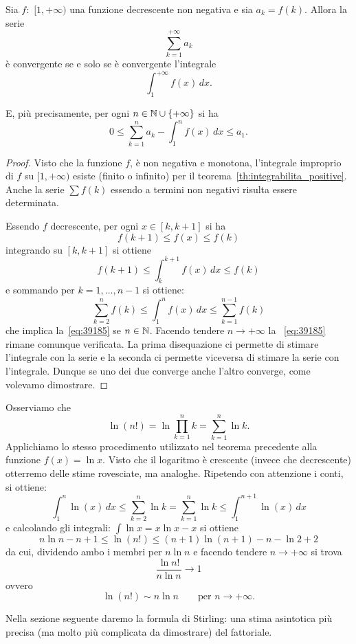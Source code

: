 \begin{theorem}
\mymark{**}
Sia $f\colon$ $[1,+\infty)$ una funzione decrescente non negativa
e sia $a_k=f(k)$.
Allora la serie
\[
   \sum_{k=1}^{+\infty} a_k
\]
è convergente se e solo se è convergente l'integrale
\[
  \int_1^{+\infty} f(x)\, dx.
\]

E, più precisamente, per ogni $n\in \mathbb N\cup{\left\{ +\infty \right\}}$ si ha
\begin{equation}\label{eq:39185}
  0
  \le \sum_{k=1}^{n} a_k - \int_1^{n}f(x)\, dx
  \le a_1.
\end{equation}

\end{theorem}
%
\begin{proof}
\mymark{**}
Visto che la funzione $f$, è non negativa e monotona,
l'integrale improprio di $f$ su $[1,+\infty)$ esiste (finito o infinito)
per il teorema~\ref{th:integrabilita_positive}.
Anche la serie $\sum f(k)$ essendo a termini non negativi risulta essere determinata.

Essendo $f$ decrescente, per ogni $x \in [k,k+1]$ si ha
\[
  f(k+1) \le f(x) \le f(k)
\]
integrando su $[k,k+1]$ si ottiene
\[
  f(k+1) \le \int_{k}^{k+1} f(x)\, dx \le f(k)
\]
e sommando per $k=1,\dots, n-1$ si ottiene:
\[
  \sum_{k=2}^{n} f(k) \le \int_{1}^{n} f(x)\, dx \le \sum_{k=1}^{n-1} f(k)
\]
che implica la~\eqref{eq:39185} se $n\in \mathbb N$. Facendo
tendere $n\to+\infty$ la ~\eqref{eq:39185} rimane comunque verificata.
La prima disequazione ci permette di stimare l'integrale con la serie
e la seconda ci permette viceversa di stimare la serie con l'integrale.
Dunque se uno dei due converge anche l'altro converge, come volevamo dimostrare.
\end{proof}

\begin{example}
\label{ex:498124}%
%
%
Osserviamo che
\[
  \ln (n!) = \ln \prod_{k=1}^n k = \sum_{k=1}^n \ln k.
\]
Applichiamo lo stesso procedimento utilizzato nel teorema precedente alla
funzione $f(x) = \ln x$. Visto che il logaritmo è crescente
(invece che decrescente) otterremo delle stime rovesciate, ma analoghe.
 Ripetendo con attenzione i conti, si ottiene:
\[
    \int_1^n \ln(x)\, dx \le  \sum_{k=2}^n \ln k = \sum_{k=1}^n \ln k \le \int_1^{n+1} \ln(x) \, dx
\]
e calcolando gli integrali: $\int \ln x = x \ln x -x$ si ottiene
\[
  n \ln n - n + 1 \le \ln(n!) \le (n+1) \ln (n+1) - n - \ln 2 +2
\]
da cui, dividendo ambo i membri per $n \ln n$ e facendo tendere $n\to +\infty$ si trova
\[
 \frac{\ln n!}{n \ln n}\to 1
\]
ovvero
\[
  \ln (n!) \sim n \ln n \qquad \text{per $n\to +\infty$.}
\]

Nella sezione seguente daremo la formula di Stirling: una stima asintotica più
precisa (ma molto più complicata
da dimostrare) del fattoriale.
\end{example}

